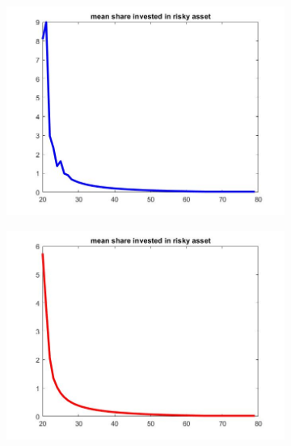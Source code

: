 \documentclass[12pt,a4paper]{article}
\begin{document}
\begin{figure}[h!]
  \centering
  \begin{subfigure}[b]{0.32\linewidth}
    \includegraphics[width=\linewidth]{graphs/Q2/mean_share.jpg}
  \end{subfigure}
  \begin{subfigure}[b]{0.32\linewidth}
      \includegraphics[width=\linewidth]{graphs/Q2/mean_share2.jpg}
  \end{subfigure}
  \begin{subfigure}[b]{0.32\linewidth}

\end{subfigure}
\end{figure}
\end{document}
